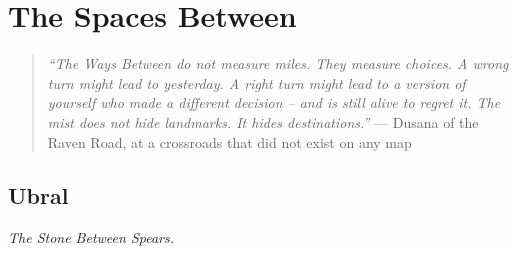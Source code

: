 \part{The Spaces Between}
\begin{quote}
  \small
  \textit{``The Ways Between do not measure miles. They measure choices. A wrong turn might lead to yesterday. A right turn might lead to a version of yourself who made a different decision -- and is still alive to regret it. The mist does not hide landmarks. It hides destinations.''}
  \noindent --- Dusana of the Raven Road, at a crossroads that did not exist on any map
  \end{quote}
\chapter{Ubral}
\emph{The Stone Between Spears.}


